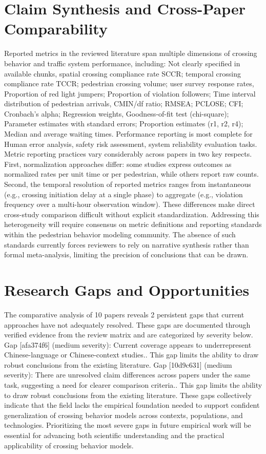 \documentclass{article}
\begin{document}
\section{Claim Synthesis and Cross-Paper Comparability}
Reported metrics in the reviewed literature span multiple dimensions of crossing behavior and traffic system performance, including: Not clearly specified in available chunks, spatial crossing compliance rate SCCR; temporal crossing compliance rate TCCR; pedestrian crossing volume; user survey response rates, Proportion of red light jumpers; Proportion of violation followers; Time interval distribution of pedestrian arrivals, CMIN/df ratio; RMSEA; PCLOSE; CFI; Cronbach's alpha; Regression weights, Goodness-of-fit test (chi-square); Parameter estimates with standard errors; Proportion estimates (r1, r2, r4); Median and average waiting times. Performance reporting is most complete for Human error analysis, safety risk assessment, system reliability evaluation tasks. Metric reporting practices vary considerably across papers in two key respects. First, normalization approaches differ: some studies express outcomes as normalized rates per unit time or per pedestrian, while others report raw counts. Second, the temporal resolution of reported metrics ranges from instantaneous (e.g., crossing initiation delay at a single phase) to aggregate (e.g., violation frequency over a multi-hour observation window). These differences make direct cross-study comparison difficult without explicit standardization. Addressing this heterogeneity will require consensus on metric definitions and reporting standards within the pedestrian behavior modeling community. The absence of such standards currently forces reviewers to rely on narrative synthesis rather than formal meta-analysis, limiting the precision of conclusions that can be drawn.

\section{Research Gaps and Opportunities}
The comparative analysis of 10 papers reveals 2 persistent gaps that current approaches have not adequately resolved. These gaps are documented through verified evidence from the review matrix and are categorized by severity below. Gap [afa374f6] (medium severity): Current coverage appears to underrepresent Chinese-language or Chinese-context studies.. This gap limits the ability to draw robust conclusions from the existing literature. Gap [10d9c631] (medium severity): There are unresolved claim differences across papers under the same task, suggesting a need for clearer comparison criteria.. This gap limits the ability to draw robust conclusions from the existing literature. These gaps collectively indicate that the field lacks the empirical foundation needed to support confident generalization of crossing behavior models across contexts, populations, and technologies. Prioritizing the most severe gaps in future empirical work will be essential for advancing both scientific understanding and the practical applicability of crossing behavior models.
\end{document}
